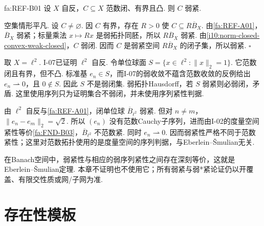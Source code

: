 \begin{FATheorem}[B][闭有界凸集的弱紧性]{fa:REF-B01}
设 \(\displaystyle X\) 自反，\(\displaystyle C\subseteq X\) 范数闭、有界且凸. 则 \(\displaystyle C\) 弱紧.
\end{FATheorem}

\begin{FAProof}
空集情形平凡. 设 \(\displaystyle C\neq\varnothing\). 因 \(\displaystyle C\) 有界，存在 \(\displaystyle R>0\) 使 \(\displaystyle C\subseteq R\overline B_X\). 由\autoref{fa:REF-A01}，\(\displaystyle \overline B_X\) 弱紧；标量乘法 \(\displaystyle x\mapsto Rx\) 是弱拓扑同胚，所以 \(\displaystyle R\overline B_X\) 弱紧. 由\autoref{i10:norm-closed-convex-weak-closed}，\(\displaystyle C\) 弱闭. 因而 \(\displaystyle C\) 是弱紧空间 \(\displaystyle R\overline B_X\) 的闭子集，所以弱紧.
\hfill\(\square\)
\end{FAProof}

\begin{FACounterexample}[凸性不可删除]
取 \(\displaystyle X=\ell^2\). I-07已证明 \(\displaystyle \ell^2\) 自反. 令单位球面
\(\displaystyle S=\{x\in\ell^2:\|x\|_2=1\}\).
它范数闭且有界，但不凸. 标准基 \(\displaystyle e_n\in S\)，而I-07的弱收敛不蕴含范数收敛的反例给出 \(\displaystyle e_n\rightharpoonup0\)，且 \(\displaystyle0\notin S\). 因此 \(\displaystyle S\) 不是弱闭集. 弱拓扑Hausdorff，若 \(\displaystyle S\) 弱紧则必弱闭，矛盾. 这里使用序列只为证明集合不弱闭，并未使用序列紧性判据.
\end{FACounterexample}

\begin{FACounterexample}[弱紧不等于范数紧]
由 \(\displaystyle \ell^2\) 自反与\autoref{fa:REF-A01}，闭单位球 \(\displaystyle \overline B_{\ell^2}\) 弱紧. 但对 \(\displaystyle n\neq m\)，
\(\displaystyle \|e_n-e_m\|_2=\sqrt2\).
所以 \(\displaystyle (e_n)\) 没有范数Cauchy子序列，进而由I-02的度量空间紧性等价\autoref{fa:FND-B03}，\(\displaystyle \overline B_{\ell^2}\) 不范数紧. 同时 \(\displaystyle e_n\rightharpoonup0\). 因而弱紧性严格不同于范数紧性；这里对范数拓扑使用的是度量空间的序列判据，与Eberlein--\v Smulian无关.
\end{FACounterexample}

\begin{FARemark}
在Banach空间中，弱紧性与相应的弱序列紧性之间存在深刻等价，这就是Eberlein--\v Smulian定理. 本章不证明也不使用它；所有弱紧与弱*紧论证仍以开覆盖、有限交性质或网/子网为准.
\end{FARemark}

\section{存在性模板}\label{sec:i10-existence}

